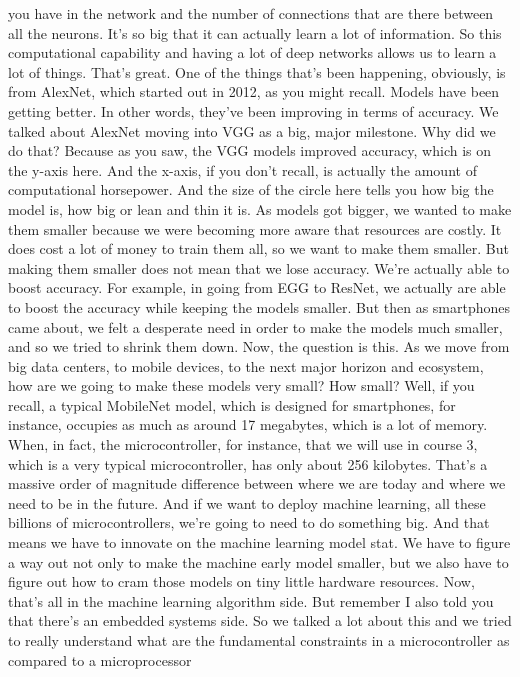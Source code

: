 you have in the network and the number of connections
that are there between all the neurons.
It's so big that it can actually learn a lot of information.
So this computational capability and having a lot of deep networks
allows us to learn a lot of things.
That's great.
One of the things that's been happening, obviously,
is from AlexNet, which started out in 2012, as you might recall.
Models have been getting better.
In other words, they've been improving in terms of accuracy.
We talked about AlexNet moving into VGG as a big, major milestone.
Why did we do that?
Because as you saw, the VGG models improved
accuracy, which is on the y-axis here.
And the x-axis, if you don't recall, is actually
the amount of computational horsepower.
And the size of the circle here tells you
how big the model is, how big or lean and thin it is.
As models got bigger, we wanted to make them smaller because we were becoming
more aware that resources are costly.
It does cost a lot of money to train them all,
so we want to make them smaller.
But making them smaller does not mean that we lose accuracy.
We're actually able to boost accuracy.
For example, in going from EGG to ResNet,
we actually are able to boost the accuracy
while keeping the models smaller.
But then as smartphones came about, we felt a desperate need
in order to make the models much smaller,
and so we tried to shrink them down.
Now, the question is this.
As we move from big data centers, to mobile devices,
to the next major horizon and ecosystem, how
are we going to make these models very small?
How small?
Well, if you recall, a typical MobileNet model,
which is designed for smartphones, for instance,
occupies as much as around 17 megabytes, which is a lot of memory.
When, in fact, the microcontroller, for instance,
that we will use in course 3, which is a very typical microcontroller,
has only about 256 kilobytes.
That's a massive order of magnitude difference between where we are today
and where we need to be in the future.
And if we want to deploy machine learning, all
these billions of microcontrollers, we're
going to need to do something big.
And that means we have to innovate on the machine learning model stat.
We have to figure a way out not only to make the machine early model smaller,
but we also have to figure out how to cram those models
on tiny little hardware resources.
Now, that's all in the machine learning algorithm side.
But remember I also told you that there's an embedded systems side.
So we talked a lot about this and we tried
to really understand what are the fundamental constraints
in a microcontroller as compared to a microprocessor
